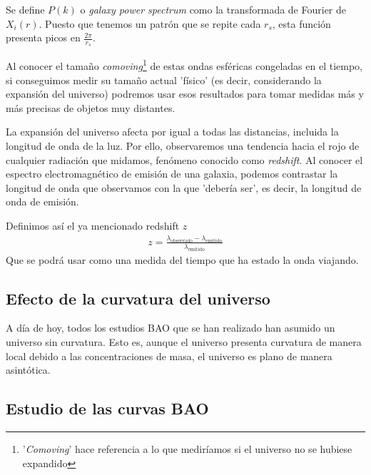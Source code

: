 Se define $P(k)$ o \textit{galaxy power spectrum} como la transformada de Fourier de $X_i(r)$. Puesto que tenemos un patrón que se repite cada $r_s$, esta función presenta picos en $\frac{2\pi}{r_s}$. 

Al conocer el tamaño \textit{comoving}\footnote{'\textit{Comoving}' hace referencia a lo que mediríamos si el universo no se hubiese expandido} de estas ondas esféricas congeladas en el tiempo, si conseguimos medir su tamaño actual 'físico' (es decir, considerando la expansión del universo) podremos usar esos resultados para tomar medidas más y más precisas de objetos muy distantes. 

La expansión del universo afecta por igual a todas las distancias, incluida la longitud de onda de la luz. Por ello, observaremos una tendencia hacia el rojo de cualquier radiación que midamos, fenómeno conocido como \textit{redshift}. Al conocer el espectro electromagnético de emisión de una galaxia, podemos contrastar la longitud de onda que observamos con la que 'debería ser', es decir, la longitud de onda de emisión. 

Definimos así el ya mencionado redshift $z$
\begin{align}
z = \frac{\lambda_{\text{observado}} - \lambda_{\text{emitido}}}{\lambda_{\text{emitido}}}
\end{align}
Que se podrá usar como una medida del tiempo que ha estado la onda viajando.

\subsection{Efecto de la curvatura del universo}

A día de hoy, todos los estudios BAO que se han realizado han asumido un universo sin curvatura. Esto es, aunque el universo presenta curvatura de manera local debido a las concentraciones de masa, el universo es plano de manera asintótica. 


\subsection{Estudio de las curvas BAO}

